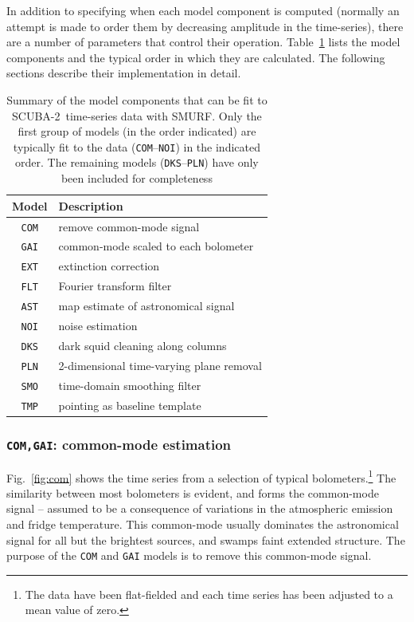 \documentclass[useAMS,usenatbib,nofootinbib]{mn2e}
\newcommand{\scuba}{SCUBA-2}
\newcommand{\model}[1]{\texttt{#1}}
\begin{document}
In addition to specifying when each model component is computed
(normally an attempt is made to order them by decreasing amplitude in
the time-series), there are a number of parameters that control their
operation. Table~\ref{tab:components} lists the model components and
the typical order in which they are calculated. The following sections
describe their implementation in detail.

\begin{table}
  \caption{Summary of the model components that can be fit to
    \scuba\ time-series data with SMURF. Only the first group of
    models (in the order indicated) are typically fit to the data
    (\model{COM}--\model{NOI}) in the indicated order. The remaining
    models (\model{DKS}--\model{PLN}) have only been included for
    completeness}
  \vspace{0.2cm}
  \centering
  \begin{tabular}{c|l}
    \hline
    Model & Description \\
    \hline
    \model{COM} & remove common-mode signal \\
    \model{GAI} & common-mode scaled to each bolometer \\
    \model{EXT} & extinction correction \\
    \model{FLT} & Fourier transform filter \\
    \model{AST} & map estimate of astronomical signal \\
    \model{NOI} & noise estimation \\
    \hline
    \model{DKS} & dark squid cleaning along columns \\
    \model{PLN} & 2-dimensional time-varying plane removal \\
    \model{SMO} & time-domain smoothing filter \\
    \model{TMP} & pointing as baseline template \\
    \hline
    \end{tabular}
  \label{tab:components}
\end{table}

\subsubsection{\model{COM,GAI}: common-mode estimation}
\label{sec:comgai}

﻿Fig.~\ref{fig:com} shows the time series from a selection of typical
bolometers.\footnote{The data have been flat-fielded and each time
series has been adjusted to a mean value of zero.} The similarity
between most bolometers is evident, and forms the common-mode signal
-- assumed to be a consequence of variations in the atmospheric
emission and fridge temperature. This common-mode usually dominates
the astronomical signal for all but the brightest sources, and swamps
faint extended structure.  The purpose of the \model{COM} and
\model{GAI} models is to remove this common-mode signal.
\end{document}
